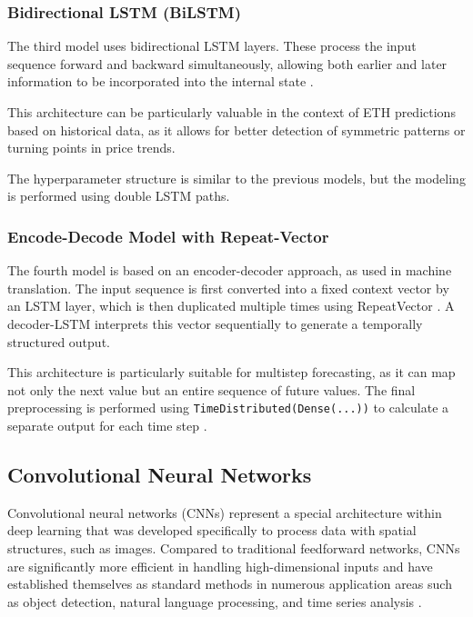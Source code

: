 \subsubsection{Bidirectional LSTM (BiLSTM)}

The third model uses bidirectional LSTM layers.
These process the input sequence forward and backward simultaneously, allowing both earlier and later information to be incorporated into the internal state \cite{bi-lstm}.

This architecture can be particularly valuable in the context of ETH predictions based on historical data, as it allows for better detection of symmetric patterns or turning points in price trends.

The hyperparameter structure is similar to the previous models, but the modeling is performed using double LSTM paths.



\subsubsection{Encode-Decode Model with Repeat-Vector}

The fourth model is based on an encoder-decoder approach, as used in machine translation.
The input sequence is first converted into a fixed context vector by an LSTM layer, which is then duplicated multiple times using RepeatVector \cite{keras-repeat-vector}.
A decoder-LSTM interprets this vector sequentially to generate a temporally structured output.

This architecture is particularly suitable for multistep forecasting, as it can map not only the next value but an entire sequence of future values.
The final preprocessing is performed using \verb|TimeDistributed(Dense(...))| to calculate a separate output for each time step \cite{keras-time-distributed}.



\subsection{Convolutional Neural Networks}
\label{chap:cnn}

Convolutional neural networks (CNNs) represent a special architecture within deep learning that was developed specifically to process data with spatial structures, such as images.
Compared to traditional feedforward networks, CNNs are significantly more efficient in handling high-dimensional inputs and have established themselves as standard methods in numerous application areas such as object detection, natural language processing, and time series analysis \cite{cnn-for-time-series}.

